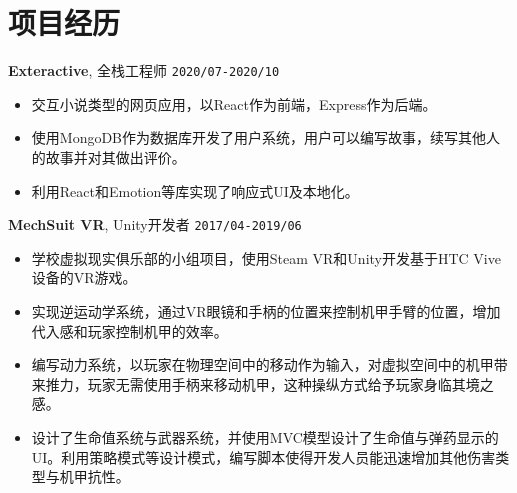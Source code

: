 \documentclass[10pt, letterpaper]{ctexart}
\begin{document}
	\section{项目经历}
	\smallskip
	\textbf{\large Exteractive}, 全栈工程师 \hfill \texttt{2020/07-2020/10}
	\begin{itemize}
		\item 交互小说类型的网页应用，以React作为前端，Express作为后端。

		\item 使用MongoDB作为数据库开发了用户系统，用户可以编写故事，续写其他人的故事并对其做出评价。

		\item 利用React和Emotion等库实现了响应式UI及本地化。

	\end{itemize}
	\textbf{\large MechSuit VR}, Unity开发者 \hfill \texttt{2017/04-2019/06}
	\begin{itemize}
		\item 学校虚拟现实俱乐部的小组项目，使用Steam VR和Unity开发基于HTC Vive设备的VR游戏。

		\item 实现逆运动学系统，通过VR眼镜和手柄的位置来控制机甲手臂的位置，增加代入感和玩家控制机甲的效率。

		\item 编写动力系统，以玩家在物理空间中的移动作为输入，对虚拟空间中的机甲带来推力，玩家无需使用手柄来移动机甲，这种操纵方式给予玩家身临其境之感。

		\item 设计了生命值系统与武器系统，并使用MVC模型设计了生命值与弹药显示的UI。利用策略模式等设计模式，编写脚本使得开发人员能迅速增加其他伤害类型与机甲抗性。

	\end{itemize}
\end{document}
